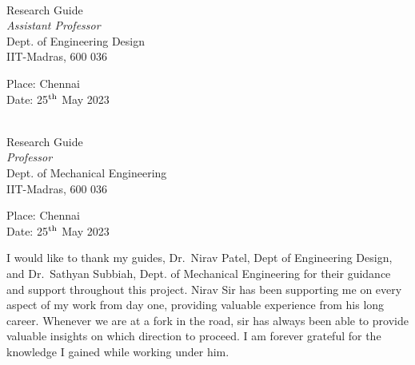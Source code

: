 \documentclass[BTech]{iitmdiss}
\begin{document}
    \begin{paracol}{2}
        \begin{singlespacing}
            \hspace*{-0.25in}
            \parbox{2.5in}{
                 \\
                \noindent Research Guide \\
                \noindent \textit{Assistant Professor} \\
                \noindent Dept. of Engineering Design\\
                \noindent IIT-Madras, 600 036
            }
            \hspace*{1.56in}

            \vspace*{0.3in}
            \noindent Place: Chennai\\
            Date: 25$^{\textnormal{th}}$ May 2023

        \end{singlespacing}

        \switchcolumn
        \begin{singlespacing}
            \hspace*{-0.25in}
            \parbox{2.5in}{
                 \\
                \noindent Research Guide \\
                \noindent \textit{Professor} \\
                \noindent Dept. of Mechanical Engineering\\
                \noindent IIT-Madras, 600 036
            }
            \hspace*{1.56in}

            \vspace*{0.3in}
            \noindent Place: Chennai\\
            Date: 25$^{\textnormal{th}}$ May 2023

        \end{singlespacing}

    \end{paracol}


    \acknowledgements

    I would like to thank my guides, Dr.\ Nirav Patel, Dept of Engineering Design, and Dr.\ Sathyan Subbiah, Dept. of Mechanical Engineering for their guidance and support throughout this project.
    Nirav Sir has been supporting me on every aspect of my work from day one, providing valuable experience from his long career.
    Whenever we are at a fork in the road, sir has always been able to provide valuable insights on which direction to proceed.
    I am forever grateful for the knowledge I gained while working under him.
\end{document}
